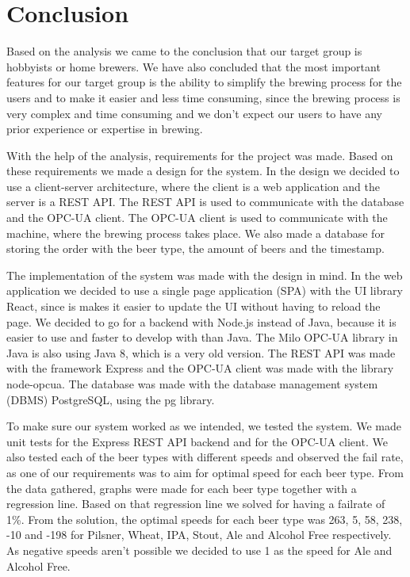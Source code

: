 \section{Conclusion}
Based on the analysis we came to the conclusion that our target group is hobbyists or home brewers.
We have also concluded that the most important features for our target group is the ability to simplify the brewing process for the users and
to make it easier and less time consuming, since the brewing process is very complex and time consuming
and we don't expect our users to have any prior experience or expertise in brewing.\newline

With the help of the analysis, requirements for the project was made.
Based on these requirements we made a design for the system.
In the design we decided to use a client-server architecture, where the client is a web application and the server is a REST API.
The REST API is used to communicate with the database and the OPC-UA client.
The OPC-UA client is used to communicate with the machine, where the brewing process takes place.
We also made a database for storing the order with the beer type, the amount of beers and the timestamp.\newline

The implementation of the system was made with the design in mind.
In the web application we decided to use a single page application (SPA) with the UI library React,
since is makes it easier to update the UI without having to reload the page.
We decided to go for a backend with Node.js instead of Java, because it is easier to use and faster to develop with than Java.
The Milo OPC-UA library in Java is also using Java 8, which is a very old version.
The REST API was made with the framework Express and the OPC-UA client was made with the library node-opcua.
The database was made with the database management system (DBMS) PostgreSQL, using the pg library.\newline

To make sure our system worked as we intended, we tested the system.
We made unit tests for the Express REST API backend and for the OPC-UA client.
We also tested each of the beer types with different speeds and observed the fail rate,
as one of our requirements was to aim for optimal speed for each beer type.
From the data gathered, graphs were made for each beer type together with a regression line.
Based on that regression line we solved for having a failrate of 1\%.
From the solution, the optimal speeds for each beer type was 263, 5, 58, 238, -10 and -198 for Pilsner, Wheat, IPA, Stout, Ale and Alcohol Free respectively.
As negative speeds aren't possible we decided to use 1 as the speed for Ale and Alcohol Free.\newline